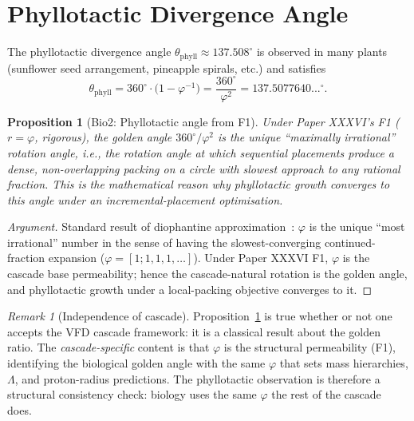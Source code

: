 \documentclass[12pt]{article}
\newtheorem{proposition}[theorem]{Proposition}
\theoremstyle{definition}
\theoremstyle{remark}
\newtheorem{remark}[theorem]{Remark}
\begin{document}
\section{Phyllotactic Divergence Angle}\label{sec:phyllotaxis}

The phyllotactic divergence angle $\theta_{\mathrm{phyll}} \approx 137.508^\circ$ is observed in many plants (sunflower seed arrangement, pineapple spirals, etc.) and satisfies
\begin{equation}
\theta_{\mathrm{phyll}} = 360^\circ \cdot \bigl(1 - \varphi^{-1}\bigr) = \frac{360^\circ}{\varphi^2} = 137.5077640...^\circ.
\end{equation}

\begin{proposition}[Bio2: Phyllotactic angle from F1]\label{prop:phyllotaxis}
Under Paper XXXVI's F1 ($r = \varphi$, rigorous), the golden angle $360^\circ / \varphi^2$ is the unique ``maximally irrational'' rotation angle, i.e., the rotation angle at which sequential placements produce a dense, non-overlapping packing on a circle with slowest approach to any rational fraction. This is the mathematical reason why phyllotactic growth converges to this angle under an incremental-placement optimisation.
\end{proposition}

\begin{proof}[Argument]
Standard result of diophantine approximation~\citep{HardyWright}: $\varphi$ is the unique ``most irrational'' number in the sense of having the slowest-converging continued-fraction expansion ($\varphi = [1; 1, 1, 1, \ldots]$). Under Paper XXXVI F1, $\varphi$ is the cascade base permeability; hence the cascade-natural rotation is the golden angle, and phyllotactic growth under a local-packing objective converges to it.
\end{proof}

\begin{remark}[Independence of cascade]
Proposition~\ref{prop:phyllotaxis} is true whether or not one accepts the VFD cascade framework: it is a classical result about the golden ratio. The \emph{cascade-specific} content is that $\varphi$ is the structural permeability (F1), identifying the biological golden angle with the same $\varphi$ that sets mass hierarchies, $\Lambda$, and proton-radius predictions. The phyllotactic observation is therefore a structural consistency check: biology uses the same $\varphi$ the rest of the cascade does.
\end{remark}
\end{document}
